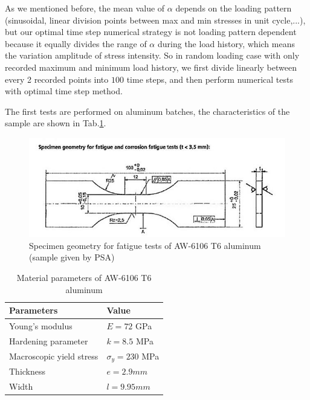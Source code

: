 As we mentioned before, the mean value of $\alpha$ depends on the loading pattern (sinusoidal, linear division points between max and min stresses in unit cycle,...), but our optimal time step numerical strategy is not loading pattern dependent because it equally divides the range of $\alpha$ during the load history, which means the variation amplitude of stress intensity. So in random loading case with only recorded maximum and minimum load history, we first divide linearly between every 2 recorded points into $100$ time steps, and then perform numerical tests with optimal time step method.

The first tests are performed on aluminum batches, the characteristics of the sample are shown in Tab.\ref{tab:cetim}.
\begin{figure}[!h]
\centering
\includegraphics[width=\textwidth]{figures//aluminum_cetim.png} 
\caption{Specimen geometry for fatigue tests of AW-6106 T6 aluminum (sample given by PSA)}
\label{fig:aluminum}
\end{figure}
\begin{table}[!h]
\centering
\begin{tabular}{ll}
\hline
\textbf{Parameters}                                         & \textbf{Value}                    \\ \hline
Young's modulus                                             & $E=72$ GPa                       \\
Hardening parameter                                         &  $k=8.5$ MPa \\
Macroscopic yield stress                                    & $\sigma_y=230$ MPa              \\
Thickness & $e=2.9mm$                        \\
Width		 & $l= 9.95mm$                        \\ \hline
\end{tabular}
\caption{Material parameters of AW-6106 T6 aluminum}
\label{tab:cetim}
\end{table}

